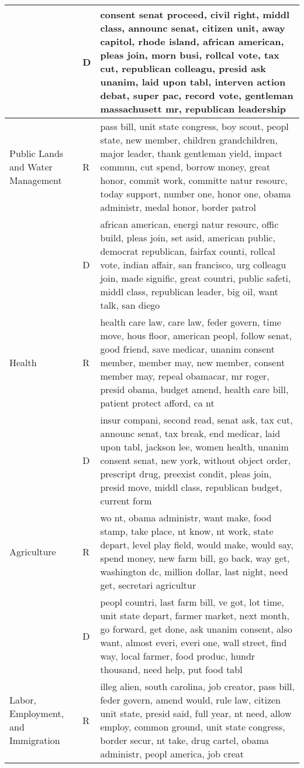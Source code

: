 \begin{longtable}{p{}p{}p{}}
   & D & consent senat proceed, civil right, middl class, announc senat, citizen unit, away capitol, rhode island, african american, pleas join, morn busi, rollcal vote, tax cut, republican colleagu, presid ask unanim, laid upon tabl, interven action debat, super pac, record vote, gentleman massachusett mr, republican leadership \\ 
   \hline
Public Lands and Water Management & R & pass bill, unit state congress, boy scout, peopl state, new member, children grandchildren, major leader, thank gentleman yield, impact commun, cut spend, borrow money, great honor, commit work, committe natur resourc, today support, number one, honor one, obama administr, medal honor, border patrol \\ 
   & D & african american, energi natur resourc, offic build, pleas join, set asid, american public, democrat republican, fairfax counti, rollcal vote, indian affair, san francisco, urg colleagu join, made signific, great countri, public safeti, middl class, republican leader, big oil, want talk, san diego \\ 
   \hline
Health & R & health care law, care law, feder govern, time move, hous floor, american peopl, follow senat, good friend, save medicar, unanim consent member, member may, new member, consent member may, repeal obamacar, mr roger, presid obama, budget amend, health care bill, patient protect afford, ca nt \\ 
   & D & insur compani, second read, senat ask, tax cut, announc senat, tax break, end medicar, laid upon tabl, jackson lee, women health, unanim consent senat, new york, without object order, prescript drug, preexist condit, pleas join, presid move, middl class, republican budget, current form \\ 
   \hline
Agriculture & R & wo nt, obama administr, want make, food stamp, take place, nt know, nt work, state depart, level play field, would make, would say, spend money, new farm bill, go back, way get, washington dc, million dollar, last night, need get, secretari agricultur \\ 
   & D & peopl countri, last farm bill, ve got, lot time, unit state depart, farmer market, next month, go forward, get done, ask unanim consent, also want, almost everi, everi one, wall street, find way, local farmer, food produc, hundr thousand, need help, put food tabl \\ 
   \hline
Labor, Employment, and Immigration & R & illeg alien, south carolina, job creator, pass bill, feder govern, amend would, rule law, citizen unit state, presid said, full year, nt need, allow employ, common ground, unit state congress, border secur, nt take, drug cartel, obama administr, peopl america, job creat \\ 

\end{longtable}
